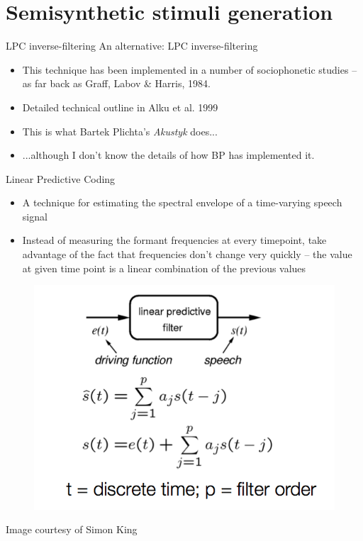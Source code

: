 \documentclass{beamer}
\begin{document}
\section{Semisynthetic stimuli generation}
\begin{frame}{LPC inverse-filtering}
An alternative: LPC inverse-filtering
\begin{itemize}
\item{This technique has been implemented in a number of sociophonetic studies -- as far back as Graff, Labov \& Harris, 1984.}
\item{Detailed technical outline in Alku et al. 1999}
\item{This is what Bartek Plichta's \textit{Akustyk} does...}
\item{...although I don't know the details of how BP has implemented it.}
\end{itemize}
\end{frame}
\begin{frame}
Linear Predictive Coding
\begin{itemize}
\item{A technique for estimating the spectral envelope of a time-varying speech signal}
\item{Instead of measuring the formant frequencies at every timepoint, take advantage of the fact that frequencies don't change very quickly -- the value at given time point is a linear combination of the previous values}
\end{itemize}
\centering
\begin{figure}
\includegraphics[scale=0.3,keepaspectratio]{linear_predictive_filter.png}
\end{figure}
\footnotesize{Image courtesy of Simon King}
\end{frame}
\end{document}
